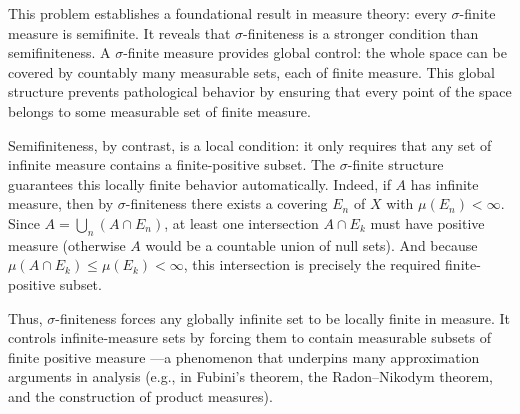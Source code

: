 \begin{interpretation}
This problem establishes a foundational result in measure theory: every $\sigma$-finite measure is semifinite. It reveals that $\sigma$-finiteness is a stronger condition than semifiniteness. A $\sigma$-finite measure provides global control: the whole space can be covered by countably many measurable sets, each of finite measure. This global structure prevents pathological behavior by ensuring that every point of the space belongs to some measurable set of finite measure.

Semifiniteness, by contrast, is a local condition: it only requires that any set of infinite measure contains a finite-positive subset. The $\sigma$-finite structure guarantees this locally finite behavior automatically. Indeed, if $A$ has infinite measure, then by $\sigma$-finiteness there exists a covering ${E_n}$ of $X$ with $\mu(E_n)<\infty$. Since $A = \bigcup_n (A \cap E_n)$, at least one intersection $A \cap E_k$ must have positive measure (otherwise $A$ would be a countable union of null sets). And because $\mu(A \cap E_k) \le \mu(E_k) < \infty$, this intersection is precisely the required finite-positive subset.

Thus, $\sigma$-finiteness forces any globally infinite set to be locally finite in measure. It controls infinite-measure sets by forcing them to contain measurable subsets of finite positive measure
—a phenomenon that underpins many approximation arguments in analysis (e.g., in Fubini's theorem, the Radon–Nikodym theorem, and the construction of product measures).
\end{interpretation}